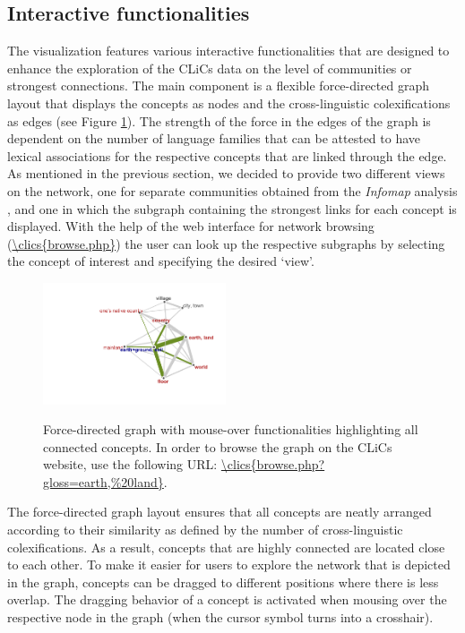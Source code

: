 \subsection{Interactive functionalities}



The visualization features various interactive functionalities that are designed to enhance the exploration of the CLiCs data on the level of communities or strongest connections. The main component is a flexible force-directed graph layout that displays the concepts as nodes and the cross-linguistic colexifications as edges (see Figure \ref{EarthLand}). The strength of the force in the edges of the graph is dependent on the number of language families that can be attested to have lexical associations for the respective concepts that are linked through the edge. As mentioned in the previous section, we decided to provide two different views on the network, one for separate communities obtained from the \emph{Infomap} analysis \cite{Rosvall2008}, and one in which the subgraph containing the strongest links for each concept is displayed.  With the help of the web interface for network browsing (\url{\clics{browse.php}}) the user can look up the respective subgraphs by selecting the concept of interest and specifying the desired `view'.

\begin{figure}[htbp]
    \centering
    \href{\clics{browse.php?gloss=earth,\%20land}}{\includegraphics[width=0.48\textwidth,trim=5cm 2cm 1cm 1cm]{img/earthland2.pdf}}
\caption{Force-directed graph with mouse-over functionalities highlighting all connected concepts.
In order to browse the graph on the CLiCs website, use the following URL: \url{\clics{browse.php?gloss=earth,\%20land}}.}
\label{EarthLand}
\end{figure}

The force-directed graph layout ensures that all concepts are neatly arranged according to their similarity as defined by the number of cross-linguistic colexifications. As a result, concepts that are highly connected are located close to each other.  To make it easier for users to explore the network that is depicted in the graph, concepts can be dragged to different positions where there is less overlap. The dragging behavior of a concept  is activated when mousing over the respective node in the graph (when the cursor symbol turns into a crosshair). 

